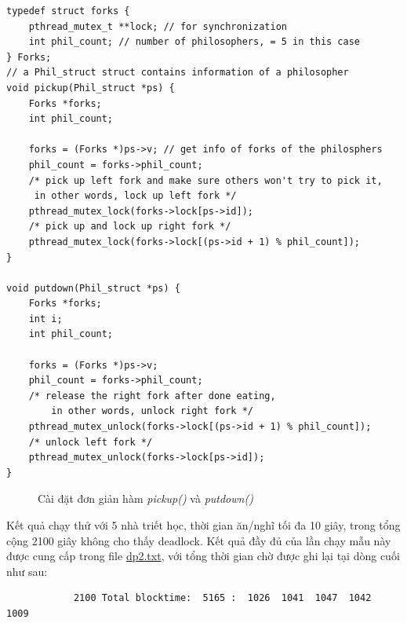 \documentclass{article}
\begin{document}
\begin{shaded}
    \begin{lstlisting}
typedef struct forks {
    pthread_mutex_t **lock; // for synchronization
    int phil_count; // number of philosophers, = 5 in this case
} Forks;
// a Phil_struct struct contains information of a philosopher
void pickup(Phil_struct *ps) { 
    Forks *forks;
    int phil_count;

    forks = (Forks *)ps->v; // get info of forks of the philosphers
    phil_count = forks->phil_count;   
    /* pick up left fork and make sure others won't try to pick it, 
     in other words, lock up left fork */
    pthread_mutex_lock(forks->lock[ps->id]); 
    /* pick up and lock up right fork */
    pthread_mutex_lock(forks->lock[(ps->id + 1) % phil_count]); 
}

void putdown(Phil_struct *ps) {
    Forks *forks;
    int i;
    int phil_count;

    forks = (Forks *)ps->v;
    phil_count = forks->phil_count;    
    /* release the right fork after done eating, 
        in other words, unlock right fork */
    pthread_mutex_unlock(forks->lock[(ps->id + 1) % phil_count]); 
    /* unlock left fork */
    pthread_mutex_unlock(forks->lock[ps->id]);                    
}
    \end{lstlisting}
\end{shaded}

\begin{figure}[h]
    \centering
    \caption{Cài đặt đơn giản hàm \textit{pickup()} và \textit{putdown()}}
\end{figure}

Kết quả chạy thử với 5 nhà triết học, thời gian ăn/nghĩ tối đa 10 giây, trong tổng cộng 2100 giây
không cho thấy deadlock. Kết quả đầy đủ của lần chạy mẫu này được cung cấp trong file \href{www.github.com}{dp2.txt},
với tổng thời gian chờ được ghi lại tại dòng cuối như sau:
\begin{verbatim}
            2100 Total blocktime:  5165 :  1026  1041  1047  1042  1009
\end{verbatim}
\end{document}
